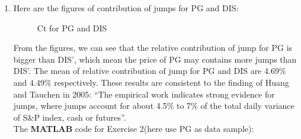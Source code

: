 \documentclass[12pt,letterpaper]{article}
\begin{document}
\begin{enumerate}[label=\textbf{(\Alph*)}]
\item
Here are the figures of contribution of jumps for PG and DIS:
 \begin{figure}[H]
            \centering
            \caption{Ct for PG and DIS}
\end{figure}

From the figures, we can see that the relative contribution of jump for PG is bigger than DIS', which mean the price of PG may contains more jumps than DIS'. The mean of relative contribution of jump for PG and DIS are 4.69\% and 4.49\% respectively. These results are consistent to the finding of Huang and Tauchen in 2005: ``The empirical work indicates strong evidence for jumps, where jumps account for about 4.5\% to 7\% of the total daily variance of S\&P index, cash or futures''.\\


The \textbf{MATLAB} code for Exercise 2(here use PG as data sample):
   
\end{enumerate}
\newpage
\end{document}
